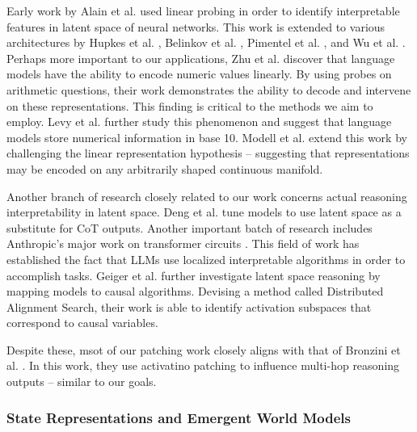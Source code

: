 \documentclass[11pt]{article}
\begin{document}
Early work by Alain et al. \cite{alain2016understanding} used linear probing in order to identify interpretable features in latent space of neural networks. This work is extended to various architectures by Hupkes et al. \cite{hupkes2018visualisation}, Belinkov et al. \cite{belinkov-etal-2017-neural}, Pimentel et al. \cite{pimentel-etal-2020-information}, and Wu et al. \cite{wu-etal-2020-perturbed}. Perhaps more important to our applications, Zhu et al. \cite{zhu2024language} discover that language models have the ability to encode numeric values linearly. By using probes on arithmetic questions, their work demonstrates the ability to decode and intervene on these representations. This finding is critical to the methods we aim to employ. Levy et al. \cite{levy2025language} further study this phenomenon and suggest that language models store numerical information in base 10. Modell et al. \cite{modell2025origins} extend this work by challenging the linear representation hypothesis -- suggesting that representations may be encoded on any arbitrarily shaped continuous manifold. 

Another branch of research closely related to our work concerns actual reasoning interpretability in latent space. Deng et al. \cite{deng2023implicit} tune models to use latent space as a substitute for CoT outputs. Another important batch of research includes Anthropic's major work on transformer circuits \cite{elhage2021mathematical}. This field of work has established the fact that LLMs use localized interpretable algorithms in order to accomplish tasks. Geiger et al. \cite{geiger2021causal} further investigate latent space reasoning by mapping models to causal algorithms. Devising a method called Distributed Alignment Search, their work is able to identify activation subspaces that correspond to causal variables. 

Despite these, msot of our patching work closely aligns with that of Bronzini et al. \cite{bronzini2024unveiling}. In this work, they use activatino patching to influence multi-hop reasoning outputs -- similar to our goals. 


\subsubsection{State Representations and Emergent World Models}
\end{document}
